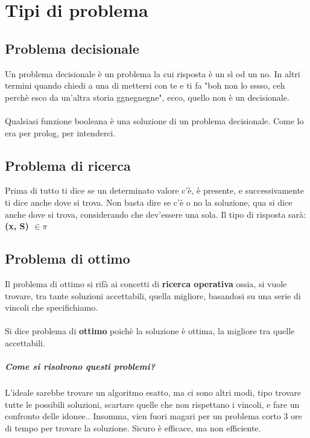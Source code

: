 \documentclass[12pt, a4paper, openany, twoside]{book}
\begin{document}
\chapter{Tipi di problema}
\section{Problema decisionale}
Un problema decisionale è un problema la cui risposta è un sì od un no. In altri
termini quando chiedi a una di mettersi con te e ti fa "boh non lo sssso, ceh 
perchè esco da un'altra storia ggnegnegne", ecco, quello non è un decisionale. \\ \\
Qualsiasi funzione booleana è una soluzione di un problema decisionale. Come lo
era per prolog, per intenderci. 
\section{Problema di ricerca}
Prima di tutto ti dice se un determinato valore c'è, è presente, e successivamente
ti dice anche dove si trova. Non basta dire se c'è o no la soluzione, qua si dice
anche dove si trova, considerando che dev'essere una sola. Il tipo di risposta
sarà: \textbf{(x, S) $\in \pi$}
\section{Problema di ottimo}
Il problema di ottimo si rifà ai concetti di \textbf{ricerca operativa} ossia, si
vuole trovare, tra tante soluzioni accettabili, quella migliore, basandosi su una
serie di vincoli che specifichiamo.\\ \\
Si dice problema di \textbf{ottimo} poichè la soluzione è ottima, la migliore tra
quelle accettabili.
\paragraph{Come si risolvono questi problemi? }L'ideale sarebbe trovare un algoritmo
esatto, ma ci sono altri modi, tipo trovare tutte le possibili soluzioni, scartare
quelle che non rispettano i vincoli, e fare un confronto delle idonee.. Insomma,
vien fuori magari per un problema corto 3 ore di tempo per trovare la soluzione.
Sicuro è efficace, ma non efficiente.
\end{document}

